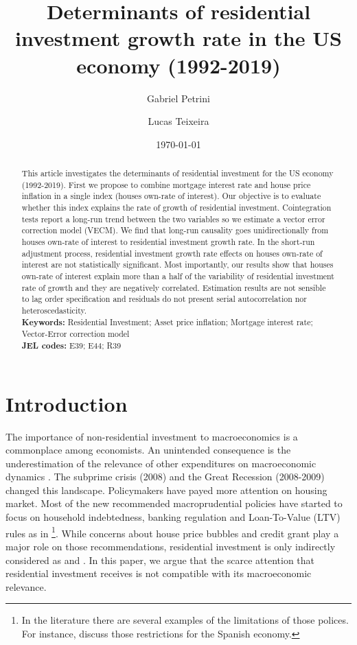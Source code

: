\documentclass[12pt, a4paper]{article}
\author[1]{Gabriel Petrini}
\affil[1]{PhD Student at University of Campinas (Brazil), Email: \url{gpetrinidasilveira@gmail.com}} %
\author[2]{Lucas Teixeira}
\affil[2]{Assistant Professor at University of Campinas (Brazil), Email: \url{lucastei@unicamp.br}} %
\date{\today}
\title{Determinants of residential investment growth rate in the US economy (1992-2019)}
\begin{document}
\maketitle



\begin{abstract}
This article investigates the determinants of residential investment for the US economy (1992-2019).
First we propose to combine mortgage interest rate and house price inflation in a single index (houses own-rate of interest).
Our objective is to evaluate whether this index explains the rate of growth of residential investment.
Cointegration tests report a long-run trend between the two variables so we estimate a vector error correction model (VECM).
We find that long-run causality goes unidirectionally from houses own-rate of interest to residential investment growth rate.
In the short-run adjustment process, residential investment growth rate effects on houses own-rate of interest are not statistically significant.
Most importantly, our results show that houses own-rate of interest explain more than a half of the variability of residential investment rate of growth and they are negatively correlated.
Estimation results are not sensible to lag order specification and residuals do not present serial autocorrelation nor heteroscedasticity.
\\
\noindent \textbf{Keywords:} Residential Investment; Asset price inflation; Mortgage interest rate; Vector-Error correction model\\
\noindent \textbf{JEL codes:} E39; E44; R39
\end{abstract}


\section{Introduction}
\label{sec:org99a2050}
\label{sec:Introduction}
The importance of non-residential investment to macroeconomics is a commonplace among economists.
An unintended consequence is the underestimation of the relevance of other expenditures on macroeconomic dynamics \cite{brochier_macroeconomics_2017}.
The subprime crisis (2008) and the Great Recession (2008-2009) changed this landscape.
Policymakers have payed more attention on housing market.
Most of the new recommended macroprudential policies have started to focus on household indebtedness, banking regulation and Loan-To-Value (LTV) rules as in \textcite{arena_2020_Macroprudential}\footnote{In the literature there are several examples of the limitations of those polices. For instance, \textcite{galan_2019_LTV} discuss those restrictions for the Spanish economy.}.
While concerns about house price bubbles and credit grant play a major role on those recommendations, residential investment is only indirectly considered as \textcite{baptista_2016_Macroprudential} and \textcite{Ozel2019}.
In this paper, we argue that the scarce attention that residential investment receives is not compatible with its macroeconomic relevance.
\end{document}
